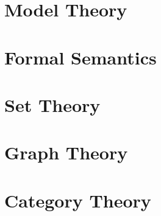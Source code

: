 \documentclass{article}
\begin{document}
\part{Model Theory}


\part{Formal Semantics}


\part{Set Theory}


\part{Graph Theory}


\part{Category Theory}

\end{document}
